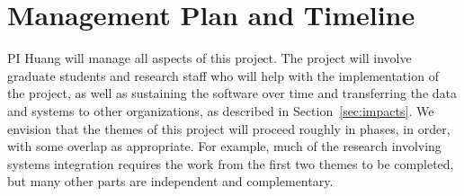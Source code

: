 \section{Management Plan and Timeline}\label{sec:management}

PI Huang will manage all aspects of this project. The project will involve
graduate students and research staff who will help with the implementation of
the project, as well as sustaining the software over time and transferring the
data and systems to other organizations, as described in
Section~\ref{sec:impacts}. We envision that the themes of this project will
proceed roughly in phases, in order, with some overlap as appropriate. For
example, much of the research involving systems integration requires the work
from the first two themes to be completed, but many other parts are
independent and complementary.

